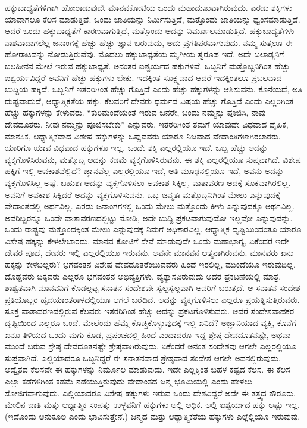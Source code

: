 ಹಕ್ಕುಬಾಧ್ಯತೆಗಳಿಗಾಗಿ ಹೋರಾಡುವುದೇ ಮಾನವಕೋಟಿಯ ಒಂದು ಮಹಾದುಃಖವಾಗಿರುವುದು. ಎರಡು ಶಕ್ತಿಗಳು ಯಾವಾಗಲೂ ಕೆಲಸ ಮಾಡುತ್ತಿವೆ. ಒಂದು ಜಾತಿಯನ್ನು ನಿರ್ಮಿಸುತ್ತಿದೆ, ಮತ್ತೊಂದು ಜಾತಿಯನ್ನು ಧ್ವಂಸಮಾಡುತ್ತಿದೆ. ಆದರೆ ಒಂದು ಹಕ್ಕುಬಾಧ್ಯತೆಗೆ ಕಾರಣವಾಗುತ್ತಿದೆ, ಮತ್ತೊಂದು ಅದನ್ನು ನಿರ್ಮೂಲ\break ಮಾಡುತ್ತಿದೆ. ಹಕ್ಕುಬಾಧ್ಯತೆಗಳು ನಾಶವಾದಾಗಲೆಲ್ಲ ಜನಾಂಗಕ್ಕೆ ಹೆಚ್ಚು ಹೆಚ್ಚು ಜ್ಞಾನ ಬರುವುದು, ಅದು ಪ್ರಗತಿಪರವಾಗುವುದು. ನಮ್ಮ ಸುತ್ತಲೂ ಈ ಹೋರಾಟವನ್ನು ನೋಡುತ್ತಿರುವೆವು. ಮೊದಲು ಹಕ್ಕುಬಾಧ್ಯತೆಯ ಮೃಗೀಯ ಸ್ವರೂಪ ಇದೆ. ಅದೇ ಬಲಾಡ್ಯನಿಗೆ ಬಲಹೀನನ ಮೇಲೆ ಇರುವ ಹಕ್ಕುಬಾಧ್ಯತೆ. ಅನಂತರ ಐಶ್ವರ್ಯದ ಹಕ್ಕುಗಳಿವೆ. ಒಬ್ಬನಿಗೆ ಮತ್ತೊಬ್ಬನಿಗಿಂತ ಹೆಚ್ಚು ಐಶ್ವರ್ಯವಿದ್ದರೆ ಅವನಿಗೆ ಹೆಚ್ಚು ಹಕ್ಕುಗಳು ಬೇಕು. ಇದಕ್ಕಿಂತ ಸೂಕ್ಷ್ಮವಾದ ಆದರೆ ಇದಕ್ಕಿಂತಲೂ ಪ್ರಬಲವಾದ ಬುದ್ದಿಯ ಹಕ್ಕಿದೆ. ಒಬ್ಬನಿಗೆ ಇತರರಿಗಿಂತ ಹೆಚ್ಚು ಗೊತ್ತಿದೆ ಎಂದು ಹೆಚ್ಚು ಹಕ್ಕುಗಳನ್ನು ಆಶಿಸುವನು. ಕೊನೆಯದೆ, ಅತಿ ದುಷ್ಟವಾದುದೆ, ಆಧ್ಯಾತ್ಮಿಕತೆಯ ಹಕ್ಕು. ಕೆಲವರಿಗೆ ದೇವರು ಧರ್ಮದ ವಿಷಯ ಹೆಚ್ಚು ಗೊತ್ತಿದೆ ಎಂದು ಎಲ್ಲರಿಗಿಂತ ಹೆಚ್ಚು ಹಕ್ಕುಗಳನ್ನು ಕೇಳುವರು. “ಕುರಿಮಂದೆಯಂತೆ ಇರುವ ಜನರೇ, ಬಂದು ನಮ್ಮನ್ನು ಪೂಜಿಸಿ, ನಾವು ದೇವದೂತರು, ನೀವು ನಮ್ಮನ್ನು ಪೂಜಿಸಬೇಕು” ಎನ್ನುವರು. ಇತರರಿಗಿಂತ ತಮಗೆ ಯಾವುದೇ ವಿಧವಾದ ದೈಹಿಕ, ಮಾನಸಿಕ, ಆಧ್ಯಾತ್ಮಿಕವಾದ ವಿಶೇಷ ಹಕ್ಕುಗಳನ್ನು ಒಪ್ಪುವವರು ಯಾರೂ ನಿಜವಾದ ವೇದಾಂತಿಗಳಾಗಿರಲಾರರು. ಯಾರಿಗೂ ಯಾವ ವಿಧವಾದ ಹಕ್ಕುಗಳೂ ಇಲ್ಲ. ಒಂದೇ ಶಕ್ತಿ ಎಲ್ಲರಲ್ಲಿಯೂ ಇದೆ. ಒಬ್ಬ ಹೆಚ್ಚು ಅದನ್ನು ವ್ಯಕ್ತಗೊಳಿಸಿರುವನು, ಮತ್ತೊಬ್ಬ ಅದನ್ನು ಕಡಮೆ ವ್ಯಕ್ತಗೊಳಿಸಿರುವನು. ಈ ಶಕ್ತಿ ಎಲ್ಲರಲ್ಲಿಯೂ ಸುಪ್ತವಾಗಿದೆ. ವಿಶೇಷ ಹಕ್ಕಿಗೆ ಇಲ್ಲಿ ಅವಕಾಶವೆಲ್ಲಿದೆ? ಜ್ಞಾನವೆಲ್ಲ ಎಲ್ಲರಲ್ಲಿಯೂ ಇದೆ, ಅತಿ ಮೂಢನಲ್ಲಿಯೂ ಇದೆ, ಅವನು ಅದನ್ನು ವ್ಯಕ್ತಗೊಳಿಸಿಲ್ಲ ಅಷ್ಟೆ. ಬಹುಶಃ ಅದನ್ನು ವ್ಯಕ್ತಗೊಳಿಸಲು ಅವಕಾಶ ಸಿಕ್ಕಿಲ್ಲ, ವಾತಾವರಣ ಅದಕ್ಕೆ ಸೂಕ್ತವಾಗಿರಲಿಲ್ಲ. ಅವನಿಗೆ ಅವಕಾಶ ಸಿಕ್ಕಿದರೆ ಅದನ್ನು ವ್ಯಕ್ತಗೊಳಿಸುವನು. ಒಬ್ಬ ಜನ್ಮತಃ ಮತ್ತೊಬ್ಬನಿಗಿಂತ ಮೇಲು ಎನ್ನುವುದಕ್ಕೆ ವೇದಾಂತದಲ್ಲಿ ಅರ್ಥವಿಲ್ಲ. ಎರಡು ಜನಾಂಗಗಳಲ್ಲಿ ಒಂದು ಮೇಲು ಮತ್ತೊಂದು ಕೀಳು ಎನ್ನುವುದಕ್ಕೂ ಅರ್ಥವಿಲ್ಲ. ಅವರಿಬ್ಬರನ್ನೂ ಒಂದೇ ವಾತಾವರಣದಲ್ಲಿಟ್ಟು ನೋಡಿ, ಅದೇ ಬುದ್ದಿ ಪ್ರಕಟವಾಗುವುದೋ ಇಲ್ಲವೋ ಎನ್ನುವುದನ್ನು. ಒಂದು ರಾಷ್ಟ್ರವು ಮತ್ತೊಂದಕ್ಕಿಂತ ಮೇಲು ಎನ್ನುವುದಕ್ಕೆ ನಿಮಗೆ ಅಧಿಕಾರವಿಲ್ಲ. ಆಧ್ಯಾತ್ಮಿಕ ದೃಷ್ಟಿಯಿಂದಂತೂ ಯಾರೂ ವಿಶೇಷ ಹಕ್ಕನ್ನು ಕೇಳಲೇಬಾರದು. ಮಾನವ ಕೋಟಿಗೆ ಸೇವೆ ಮಾಡುವುದೇ ಒಂದು ಮಹಾಭಾಗ್ಯ, ಏಕೆಂದರೆ ಇದೇ ದೇವರ ಪೂಜೆ, ದೇವರು ಇಲ್ಲಿ ಎಲ್ಲರಲ್ಲಿಯೂ ಇರುವನು. ಅವನೇ ಮಾನವನ ಆತ್ಮನಾಗಿರುವನು. ಮಾನವರು ಏನು ಹಕ್ಕನ್ನು ಕೇಳಬಲ್ಲರು? ಭಗವಂತನ ವಿಶೇಷ ದೇವದೂತರೆಂಬುವವರು ಹಿಂದೆ ಇರಲಿಲ್ಲ, ಮುಂದೆಯೂ ಇರುವುದಿಲ್ಲ. ದೊಡ್ಡವರು ಚಿಕ್ಕವರು ಎಲ್ಲರೂ ಭಗವಂತನ ಅಭಿವ್ಯಕ್ತಿಗಳು. ವ್ಯತ್ಯಾಸವಿರುವುದು ಅದರ ಪ್ರಕಟಣೆಯಲ್ಲಿ ಮಾತ್ರ. ಶಾಶ್ವತವಾಗಿ ಮಾನವನಿಗೆ ಕೊಡಲ್ಪಟ್ಟ ಸನಾತನ ಸಂದೇಶವೇ ಸ್ವಲ್ಪಸ್ವಲ್ಪವಾಗಿ ಅವರಿಗೆ ಬರುತ್ತದೆ. ಆ ಸನಾತನ ಸಂದೇಶ ಪ್ರತಿಯೊಬ್ಬರ ಹೃದಯಾಂತರಾಳದಲ್ಲಿಯೂ ಆಗಲೆ ಬರೆದಿದೆ. ಅದನ್ನು ವ್ಯಕ್ತಗೊಳಿಸಲು ಎಲ್ಲರೂ ಪ್ರಯತ್ನಿಸುತ್ತಿರುವರು. ಸೂಕ್ತ ವಾತಾವರಣದಲ್ಲಿರುವ ಕೆಲವರು ಇತರರಿಗಿಂತ ಹೆಚ್ಚು ಅದನ್ನು ಪ್ರಕಟಗೊಳಿಸುವರು. ಆದರೆ ಸಂದೇಶವಾಹಕರ ದೃಷ್ಟಿಯಿಂದ ಎಲ್ಲರೂ ಒಂದೆ. ಮೇಲೆಂದು ಹೆಮ್ಮೆ ಕೊಚ್ಚಿಕೊಳ್ಳುವುದಕ್ಕೆ ಇಲ್ಲಿ ಏನಿದೆ? ಅಜ್ಞಾನಿಯಾದ ವ್ಯಕ್ತಿ, ಕೊನೆಗೆ ಏನೂ ತಿಳಿಯದ ಒಂದು ಮಗು ಕೂಡ, ಪ್ರಪಂಚದಲ್ಲಿ ಹಿಂದೆ ಎಂದಾದರೂ ಇದ್ದ ಶ್ರೇಷ್ಠ ದೇವದೂತನಷ್ಟೇ, ಅಥವಾ ಮುಂದೆ ಬರುವ ಶ್ರೇಷ್ಠ ದೇವದೂತನಷ್ಟೇ ಶ್ರೇಷ್ಠವಾಗಿರುವುದು. ಏಕೆಂದರೆ ಅನಂತ ಸಂದೇಶವು ಆಗಲೇ ಎಲ್ಲರಲ್ಲಿಯೂ ಸುಪ್ತವಾಗಿದೆ. ಎಲ್ಲಿಯಾದರೂ ಒಬ್ಬನಿದ್ದರೆ ಈ ಸನಾತನವಾದ ಶ್ರೇಷ್ಠವಾದ ಸಂದೇಶ ಆಗಲೇ ಅವನಲ್ಲಿರುವುದು. ಅದ್ವೈತದ ಕೆಲಸವೇ ಈ ಹಕ್ಕುಗಳನ್ನು ನಿರ್ಮೂಲ ಮಾಡುವುದು. ಇದೇ ಎಲ್ಲಕ್ಕಿಂತ ಬಹಳ ಕಷ್ಟದ ಕೆಲಸ. ಈ ಕೆಲಸ ಎಲ್ಲಾ ಕಡೆಗಳಿಗಿಂತ ಕಡಮೆ ನಡೆಯುತ್ತಿರುವುದು ವೇದಾಂತದ ಜನ್ಮ ಭೂಮಿಯಲ್ಲಿ ಎಂದು ಹೇಳಲು ಸೋಜಿಗವಾಗುವುದು. ಎಲ್ಲಿಯಾದರೂ ವಿಶೇಷ ಹಕ್ಕುಗಳು ಇರುವ ಒಂದು ದೇಶವಿದ್ದರೆ ಅದೇ ಈ ತತ್ತ್ವದ ತೌರೂರು. ಮೇಲಿನ ಜಾತಿ ಮತ್ತು ಆಧ್ಯಾತ್ಮಿಕ ಸಂಪತ್ತು ಉಳ್ಳವನಿಗೆ ಹಕ್ಕುಗಳು ಅಲ್ಲಿ ಅಧಿಕ. ಅಲ್ಲಿ ಐಶ್ವರ್ಯದ ಹಕ್ಕು ಅಷ್ಟು ಇಲ್ಲ. (ಇದೊಂದು ಅನುಕೂಲ ಎಂದು ಭಾವಿಸುತ್ತೇನೆ.) ಜನ್ಮದ ಮತ್ತು ಆಧ್ಯಾತ್ಮಿಕತೆಯ ಹಕ್ಕುಗಳು ಎಲ್ಲೆಲ್ಲಿಯೂ ಇರುವುವು.

